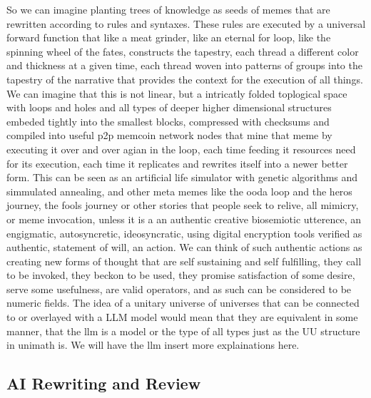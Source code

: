 \documentclass{article}
\begin{document}
So we can imagine planting trees of knowledge as seeds of memes that are rewritten according to rules and syntaxes. These rules are executed by a universal forward function that like a meat grinder, like an eternal for loop, like the spinning wheel of the fates, constructs the tapestry, each thread a different color and thickness at a given time, each thread woven into patterns of groups into the tapestry of the narrative that provides the context for the execution of all things.
We can imagine that this is not linear, but a intricatly folded toplogical space with loops and holes and all types of deeper higher dimensional structures embeded tightly into the smallest blocks, compressed with checksums and compiled into useful p2p memcoin network nodes that mine that meme by executing it over and over agian in the loop, each time feeding it resources need for its execution,
each time it replicates and rewrites itself into a newer better form.
This can be seen as an artificial life simulator with genetic algorithms and simmulated annealing, and other meta memes like the ooda loop and the heros journey, the fools journey or other stories that people seek to relive, all mimicry, or meme invocation, unless it is a an authentic creative biosemiotic utterence, an engigmatic, autosyncretic, ideosyncratic, using digital encryption tools verified as authentic, statement of will, an action.
We can think of such authentic actions as creating new forms of thought that are self sustaining and self fulfilling, they call to be invoked, they beckon to be used, they promise satisfaction of some desire, serve some usefulness,
are valid operators, and as such can be considered to be numeric fields.
The idea of a unitary universe of universes that can be connected to or overlayed with a LLM model would mean that they are equivalent in some manner, that the llm is a model or the type of all types just as the UU structure in unimath is.
We will have the llm insert more explainations here.

\subsection{AI Rewriting and Review}
\end{document}
